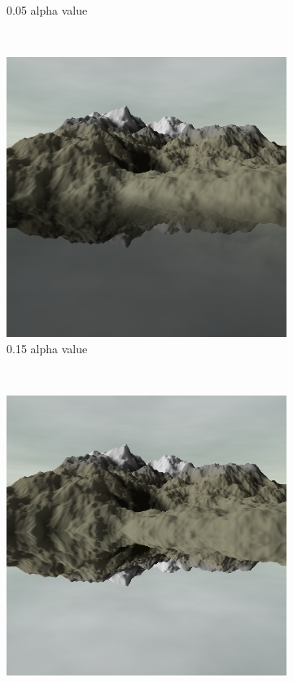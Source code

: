 \documentclass{article}
\begin{document}
\begin{figure}[H]
\begin{subfigure}[b]{0.45\textwidth}
        \caption{0.05 alpha value}
        \label{fig:waterAlpha005}
    \end{subfigure}
    ~
    \begin{subfigure}[b]{0.45\textwidth}
        \centering
        \includegraphics[scale=0.25]{waterAlpha015}
        \caption{0.15 alpha value}
        \label{fig:waterAlpha015}
    \end{subfigure}
    ~
    \begin{subfigure}[b]{0.45\textwidth}
        \centering
        \includegraphics[scale=0.25]{waterAlpha1}

\end{subfigure}
\end{figure}
\end{document}
